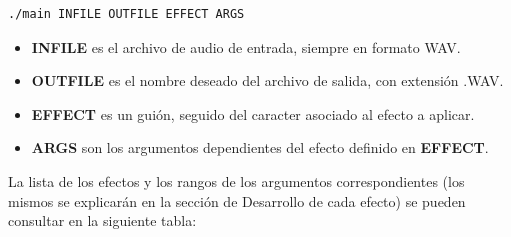 \documentclass[a4paper,spanish,12pt]{article}
\begin{document}
\lstset{language=bash}          %

\begin{lstlisting}[frame=single]
./main INFILE OUTFILE EFFECT ARGS
\end{lstlisting}

\begin{itemize}
 \item \textbf{INFILE} es el archivo de audio de entrada, siempre en formato WAV.
 \item \textbf{OUTFILE} es el nombre deseado del archivo de salida, con extensión .WAV.
 \item \textbf{EFFECT} es un guión, seguido del caracter asociado al efecto a aplicar.
 \item \textbf{ARGS} son los argumentos dependientes del efecto definido en \textbf{EFFECT}.
\end{itemize}

La lista de los efectos y los rangos de los argumentos correspondientes (los mismos se explicarán en la sección de Desarrollo de cada efecto) se pueden consultar en la siguiente tabla:
\end{document}
